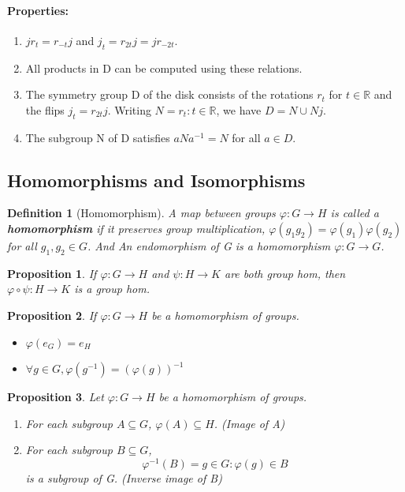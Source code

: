 \documentclass[12pt]{article}
\newtheorem{definition}{Definition}[subsection]
\newtheorem{proposition}{Proposition}[subsection]
\begin{document}
    \paragraph{Properties:}
        \begin{enumerate}
            \item $jr_t = r_{-t}j$ and $j_t = r_{2t}j = jr_{-2t}$.
            \item All products in D can be computed using these relations.
            \item The symmetry group D of the disk consists of the rotations $r_t$ for $t\in\mathbb{R}$ and the flips $j_t = r_{2t}j$. Writing $N = {r_t : t\in\mathbb{R}}$, we have $D = N \cup Nj$.
            \item The subgroup N of D satisfies $aNa^{-1} = N$ for all $a \in D$.
        \end{enumerate}

\subsection{Homomorphisms and Isomorphisms}
    \begin{definition}[Homomorphism]
        A map between groups $\varphi: G \rightarrow H$ is called a \textbf{homomorphism} if it preserves group multiplication, $\varphi(g_1g_2) = \varphi(g_1)\varphi(g_2)$ for all $g_1, g_2 \in G$. And An endomorphism of G is a homomorphism $\varphi: G \rightarrow G$.
    \end{definition}
    \begin{proposition}
    	If  $\varphi: G \rightarrow H$ and $\psi: H \rightarrow K$ are both group hom, then $\varphi \circ \psi: H \rightarrow K$ is a group hom.
    \end{proposition}
    \begin{proposition}
    	If $\varphi: G \rightarrow H$ be a homomorphism of groups.
    		\begin{itemize}
    			\item $\varphi(e_G) = e_H$
    			\item $\forall g \in G, \varphi(g^{-1}) = (\varphi(g))^{-1}$
    		\end{itemize}
    \end{proposition}
    \begin{proposition}
        Let $\varphi: G \rightarrow H$ be a homomorphism of groups.
        \begin{enumerate}
            \item For each subgroup $A \subseteq G$, $\varphi(A) \subseteq H$. (Image of A)
            \item For each subgroup $B \subseteq G$,
            \[\varphi^{-1}(B) = {g \in G: \varphi(g)\in B}\]
            is a subgroup of G. (Inverse image of B)
        \end{enumerate}
    \end{proposition}
\end{document}
